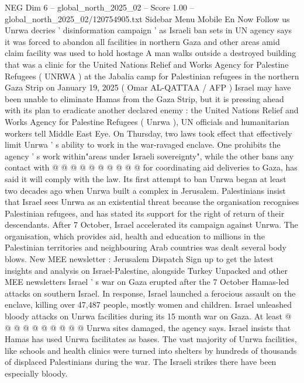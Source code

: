 \begin{textsample}{NEG Dim 6 – global\_north\_2025\_02 – Score 1.00 – global\_north\_2025\_02/120754905.txt}  \label{ex:f6_neg_083}
Sidebar Menu Mobile En Now Follow us Unrwa decries ' disinformation campaign ' as Israeli ban sets in UN agency says it was forced to abandon all facilities in northern Gaza and other areas amid claim facility was used to hold hostage A man walks outside a destroyed building that was a clinic for the United Nations Relief and Works Agency for Palestine Refugees ( UNRWA ) at the Jabalia camp for Palestinian refugees in the northern Gaza Strip on January 19, 2025 ( Omar AL-QATTAA / AFP ) Israel may have been unable to eliminate Hamas from the Gaza Strip, but it is pressing ahead with its plan to eradicate another declared enemy : the United Nations Relief and Works Agency for Palestine Refugees ( Unrwa ), UN officials and humanitarian workers tell Middle East Eye.
On Thursday, two laws took effect that effectively limit Unrwa ' s ability to work in the war-ravaged enclave.
One prohibits the agency ' s work within"areas under Israeli sovereignty", while the other bans any contact with @ @ @ @ @ @ @ @ @ @ for coordinating aid deliveries to Gaza, has said it will comply with the law.
Its first attempt to ban Unrwa began at least two decades ago when Unrwa built a complex in Jerusalem.
Palestinians insist that Israel sees Unrwa as an existential threat because the organisation recognises Palestinian refugees, and has stated its support for the right of return of their descendants.
After 7 October, Israel accelerated its campaign against Unrwa.
The organisation, which provides aid, health and education to millions in the Palestinian territories and neighbouring Arab countries was dealt several body blows.
New MEE newsletter : Jerusalem Dispatch Sign up to get the latest insights and analysis on Israel-Palestine, alongside Turkey Unpacked and other MEE newsletters Israel ' s war on Gaza erupted after the 7 October Hamas-led attacks on southern Israel.
In response, Israel launched a ferocious assault on the enclave, killing over 47,487 people, mostly women and children.
Israel unleashed bloody attacks on Unrwa facilities during its 15 month war on Gaza.
At least @ @ @ @ @ @ @ @ @ @ Unrwa sites damaged, the agency says.
Israel insists that Hamas has used Unrwa facilitates as bases.
The vast majority of Unrwa facilities, like schools and health clinics were turned into shelters by hundreds of thousands of displaced Palestinians during the war.
The Israeli strikes there have been especially bloody.

\end{textsample}
